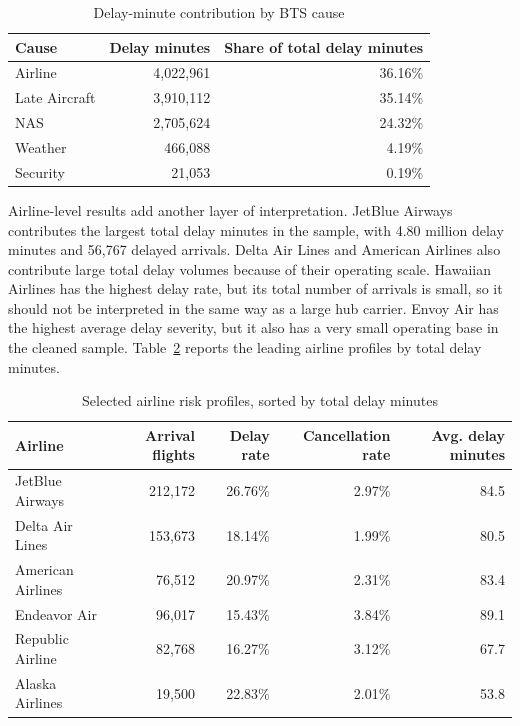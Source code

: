 \documentclass[11pt]{article}
\numberwithin{figure}{section}
\numberwithin{table}{section}
\begin{document}
\begin{table}[H]
\centering
\caption{Delay-minute contribution by BTS cause}
\label{tab:cause-shares}
\begin{tabular}{lrr}
\toprule
Cause & Delay minutes & Share of total delay minutes \\
\midrule
Airline & 4,022,961 & 36.16\% \\
Late Aircraft & 3,910,112 & 35.14\% \\
NAS & 2,705,624 & 24.32\% \\
Weather & 466,088 & 4.19\% \\
Security & 21,053 & 0.19\% \\
\bottomrule
\end{tabular}
\end{table}

Airline-level results add another layer of interpretation. JetBlue Airways contributes the largest total delay minutes in the sample, with 4.80 million delay minutes and 56,767 delayed arrivals. Delta Air Lines and American Airlines also contribute large total delay volumes because of their operating scale. Hawaiian Airlines has the highest delay rate, but its total number of arrivals is small, so it should not be interpreted in the same way as a large hub carrier. Envoy Air has the highest average delay severity, but it also has a very small operating base in the cleaned sample. Table~\ref{tab:airline-profile} reports the leading airline profiles by total delay minutes.

\begin{table}[H]
\centering
\caption{Selected airline risk profiles, sorted by total delay minutes}
\label{tab:airline-profile}
\begin{tabular}{lrrrr}
\toprule
Airline & Arrival flights & Delay rate & Cancellation rate & Avg. delay minutes \\
\midrule
JetBlue Airways & 212,172 & 26.76\% & 2.97\% & 84.5 \\
Delta Air Lines & 153,673 & 18.14\% & 1.99\% & 80.5 \\
American Airlines & 76,512 & 20.97\% & 2.31\% & 83.4 \\
Endeavor Air & 96,017 & 15.43\% & 3.84\% & 89.1 \\
Republic Airline & 82,768 & 16.27\% & 3.12\% & 67.7 \\
Alaska Airlines & 19,500 & 22.83\% & 2.01\% & 53.8 \\
\bottomrule
\end{tabular}
\end{table}
\end{document}
